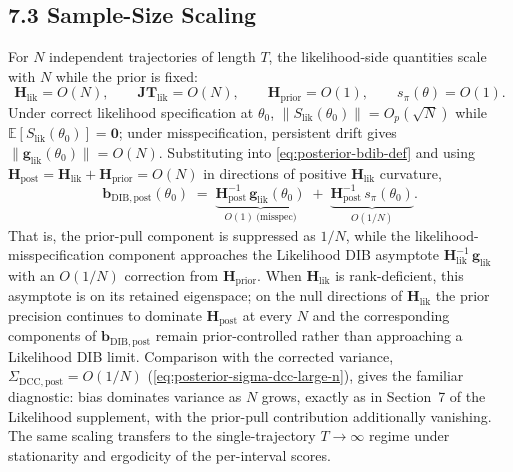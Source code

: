 \documentclass[11pt]{article}
\begin{document}
\subsection*{7.3 Sample-Size Scaling}

For $N$ independent trajectories of length $T$, the likelihood-side quantities scale with $N$ while the prior is fixed:
\begin{equation}
\mathbf H_{\mathrm{lik}} = O(N),
\qquad
\mathbf{JT}_{\mathrm{lik}} = O(N),
\qquad
\mathbf H_{\mathrm{prior}} = O(1),
\qquad
s_\pi(\theta) = O(1).
\label{eq:posterior-N-scaling-inputs}
\end{equation}
Under correct likelihood specification at $\theta_0$, $\|S_{\mathrm{lik}}(\theta_0)\| = O_p(\sqrt{N})$ while $\mathbb{E}[S_{\mathrm{lik}}(\theta_0)] = \mathbf 0$; under misspecification, persistent drift gives $\|\mathbf g_{\mathrm{lik}}(\theta_0)\| = O(N)$. Substituting into \eqref{eq:posterior-bdib-def} and using $\mathbf H_{\mathrm{post}} = \mathbf H_{\mathrm{lik}} + \mathbf H_{\mathrm{prior}} = O(N)$ in directions of positive $\mathbf H_{\mathrm{lik}}$ curvature,
\begin{equation}
\mathbf b_{\mathrm{DIB},\mathrm{post}}(\theta_0)
\;=\;
\underbrace{\mathbf H_{\mathrm{post}}^{-1}\,\mathbf g_{\mathrm{lik}}(\theta_0)}_{O(1)\ \text{(misspec)}}
\;+\;
\underbrace{\mathbf H_{\mathrm{post}}^{-1}\, s_\pi(\theta_0)}_{O(1/N)}.
\label{eq:posterior-bdib-scaling}
\end{equation}
That is, the prior-pull component is suppressed as $1/N$, while the likelihood-misspecification component approaches the Likelihood DIB asymptote $\mathbf H_{\mathrm{lik}}^{-1}\,\mathbf g_{\mathrm{lik}}$ with an $O(1/N)$ correction from $\mathbf H_{\mathrm{prior}}$. When $\mathbf H_{\mathrm{lik}}$ is rank-deficient, this asymptote is on its retained eigenspace; on the null directions of $\mathbf H_{\mathrm{lik}}$ the prior precision continues to dominate $\mathbf H_{\mathrm{post}}$ at every $N$ and the corresponding components of $\mathbf b_{\mathrm{DIB},\mathrm{post}}$ remain prior-controlled rather than approaching a Likelihood DIB limit. Comparison with the corrected variance, $\Sigma_{\mathrm{DCC},\mathrm{post}} = O(1/N)$ (\eqref{eq:posterior-sigma-dcc-large-n}), gives the familiar diagnostic: bias dominates variance as $N$ grows, exactly as in Section~7 of the Likelihood supplement, with the prior-pull contribution additionally vanishing. The same scaling transfers to the single-trajectory $T \to \infty$ regime under stationarity and ergodicity of the per-interval scores.
\end{document}

